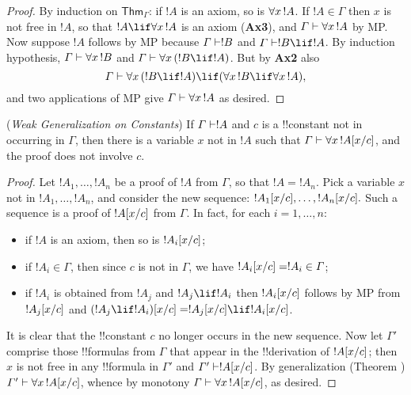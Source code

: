 \documentclass[../../include/open-logic-section]{subfiles}
\begin{document}
\begin{proof}
  By induction on $\mathsf{Thm}_\Gamma$: if $!A$ is an axiom, so
  is $\lforall[x][!A]$. If $!A\in \Gamma$ then $x$ is not free
  in $!A$, so that $!A \lif \lforall[x][!A]$ is an
  axiom (\textbf{Ax3}), and $\Gamma \Proves \lforall[x][!A]$ by
  MP. Now suppose $!A$ follows by MP because $\Gamma \Proves !B$
  and $\Gamma \Proves !B \lif !A$. By induction hypothesis,
  $\Gamma \Proves \lforall[x][!B]$ and $\Gamma \Proves \lforall[x][( !B
  \lif !A)]$. But by \textbf{Ax2} also
  \[
  \Gamma \Proves \lforall[x][( !B \lif !A)] \lif (\lforall[x][
  !B] \lif \lforall[x][!A]),
  \]
and two applications of MP give $\Gamma \Proves \lforall[x][!A]$ as
desired.
\end{proof}

\begin{thm}
  (\emph{Weak Generalization on Constants}) If $\Gamma \Proves !A$
  and $c$ is a !!{constant} not in occurring in $\Gamma$, then there is a
variable $x$ not in $!A$ such that $\Gamma \Proves
\lforall[x][\Subst{!A}{x}{c}]$, and the proof does not involve $c$.
\end{thm}

\begin{proof}
  Let $!A_1,\ldots,!A_n$ be a proof of $!A$ from
  $\Gamma$, so that $!A=!A_n$. Pick a variable $x$ not in
  $!A_1,\ldots,!A_n$, and consider the new sequence:
  $!A_1[x/c],\ldots,!A_n[x/c].$
  Such a sequence is a proof of $!A[x/c]$ from
  $\Gamma$. In fact, for each $i=1,\ldots,n$:
  \begin{itemize}
  \item if $!A$ is an axiom, then so is $!A_i[x/c]$;
  \item if $!A_i \in \Gamma$, then since $c$ is not in $\Gamma$,
    we have $!A_i[x/c] = !A_i \in \Gamma$;
  \item if $!A_i$ is obtained from $!A_j$ and $!A_j
    \lif !A_i$ then $!A_i[x/c]$ follows by MP
    from  $!A_j[x/c]$ and $\Subst{(!A_j
    \lif !A_i)}{x}{c} = \Subst{!A_j}{x}{c}
    \lif \Subst{!A_i}{x}{c}$. 
  \end{itemize}
  It is clear that the !!{constant} $c$ no longer occurs in the new
  sequence.  Now let $\Gamma'$ comprise those !!{formula}s from $\Gamma$
  that appear in the !!{derivation} of $!A[x/c]$; then $x$ is
not free in any !!{formula} in $\Gamma'$ and $\Gamma' \Proves
\Subst{!A}{x}{c}$. By generalization (Theorem
) $\Gamma' \Proves
\lforall[x][\Subst{!A}{x}{c}]$, whence by monotony $\Gamma \Proves
\lforall[x][\Subst{!A}{x}{c}]$, as desired.
\end{proof}
\end{document}

